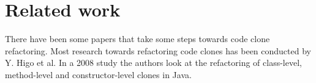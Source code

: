 \section{Related work}
There have been some papers that take some steps towards code clone refactoring. Most research towards refactoring code clones has been conducted by Y. Higo et al. In a 2008 study \cite{higo2008metric} the authors look at the refactoring of class-level, method-level and constructor-level clones in Java.
